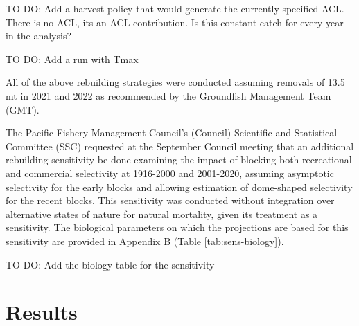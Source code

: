 \documentclass[11pt,
  english,
  a4paper,
]{article}
\begin{document}

TO DO: Add a harvest policy that would generate the currently specified ACL. There is no ACL, its an ACL contribution. Is this constant catch for every year in the analysis?

\leavevmode\tagmcend\tagstructend\par


TO DO: Add a run with Tmax

\leavevmode\tagmcend\tagstructend\par


All of the above rebuilding strategies were conducted assuming removals of 13.5 mt in 2021 and 2022 as recommended by the Groundfish Management Team (GMT).

\leavevmode\tagmcend\tagstructend\par


The Pacific Fishery Management Council's (Council) Scientific and Statistical Committee (SSC) requested at the September Council meeting that an additional rebuilding sensitivity be done examining the impact of blocking both recreational and commercial selectivity at 1916-2000 and 2001-2020, assuming asymptotic selectivity for the early blocks and allowing estimation of dome-shaped selectivity for the recent blocks. This sensitivity was conducted without integration over alternative states of nature for natural mortality, given its treatment as a sensitivity. The biological parameters on which the projections are based for this sensitivity are provided in {\protect\hyperlink{append_b}{Appendix B}\leavevmode\tagmcend\tagstructend} (Table \ref{tab:sens-biology}).

\leavevmode\tagmcend\tagstructend\par


TO DO: Add the biology table for the sensitivity

\leavevmode\tagmcend\tagstructend\par


\hypertarget{results}{%
\section{Results}\label{results}}
\end{document}
